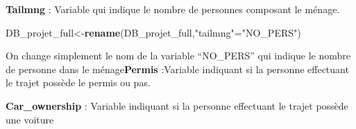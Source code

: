 \documentclass[
]{article}
\newenvironment{Shaded}{\begin{snugshade}}{\end{snugshade}}
\newcommand{\AttributeTok}[1]{\textcolor[rgb]{0.13,0.29,0.53}{#1}}
\newcommand{\DecValTok}[1]{\textcolor[rgb]{0.00,0.00,0.81}{#1}}
\newcommand{\FunctionTok}[1]{\textcolor[rgb]{0.13,0.29,0.53}{\textbf{#1}}}
\newcommand{\NormalTok}[1]{#1}
\newcommand{\OtherTok}[1]{\textcolor[rgb]{0.56,0.35,0.01}{#1}}
\newcommand{\SpecialCharTok}[1]{\textcolor[rgb]{0.81,0.36,0.00}{\textbf{#1}}}
\newcommand{\StringTok}[1]{\textcolor[rgb]{0.31,0.60,0.02}{#1}}
\begin{document}
\textbf{Tailmng} : Variable qui indique le nombre de personnes composant
le ménage.

\begin{Shaded}
\begin{Highlighting}[]
\NormalTok{DB\_projet\_full}\OtherTok{\textless{}{-}}\FunctionTok{rename}\NormalTok{(DB\_projet\_full,}\StringTok{"tailmng"}\OtherTok{=}\StringTok{"NO\_PERS"}\NormalTok{)}
\end{Highlighting}
\end{Shaded}

On change simplement le nom de la variable ``NO\_PERS'' qui indique le
nombre de personne dans le ménage\newline \textbf{Permis} :Variable
indiquant si la personne effectuant le trajet possède le permis ou pas.

\begin{Shaded}
\end{Shaded}

\textbf{Car\_ownership} : Variable indiquant si la personne effectuant
le trajet possède une voiture
\end{document}
